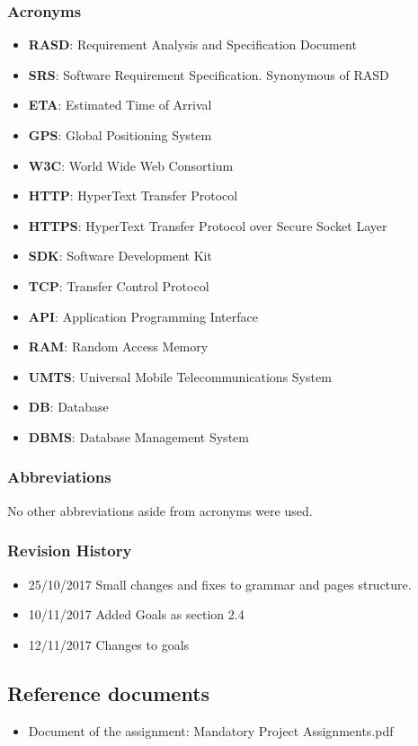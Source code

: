 \subsubsection{Acronyms}
\begin{itemize}
\item \textbf{RASD}: Requirement Analysis and Specification Document
\item \textbf{SRS}: Software Requirement Specification. Synonymous of RASD
\item \textbf{ETA}: Estimated Time of Arrival
\item \textbf{GPS}: Global Positioning System
\item \textbf{W3C}: World Wide Web Consortium
\item \textbf{HTTP}: HyperText Transfer Protocol 
\item \textbf{HTTPS}: HyperText Transfer Protocol over Secure Socket Layer 
\item \textbf{SDK}: Software Development Kit
\item \textbf{TCP}: Transfer Control Protocol
\item \textbf{API}: Application Programming Interface
\item \textbf{RAM}: Random Access Memory
\item \textbf{UMTS}: Universal Mobile Telecommunications System
\item \textbf{DB}: Database
\item \textbf{DBMS}: Database Management System
\end{itemize}
\subsubsection{Abbreviations}
No other abbreviations aside from acronyms were used.
\subsubsection{Revision History}
\begin{itemize}
\item 25/10/2017 Small changes and fixes to grammar and pages structure.
\item 10/11/2017 Added Goals as section 2.4
\item 12/11/2017 Changes to goals
\end{itemize}
\subsection{Reference documents}
\begin{itemize}
\item Document of the assignment: Mandatory Project Assignments.pdf
\end{itemize}